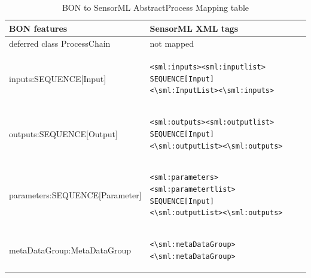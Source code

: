\documentclass[]{final_report}
\begin{document}
\begin{table}[!th]
\centering
\begin{tabular}{|l|l|}
\hline
BON features & SensorML XML tags\\
\hline
   deferred class ProcessChain  & not mapped\\
\hline     
     inputs:SEQUENCE[Input] & \begin{lstlisting}
<sml:inputs><sml:inputlist>
SEQUENCE[Input]
<\sml:InputList><\sml:inputs>\end{lstlisting}\\

\hline 
     outputs:SEQUENCE[Output] & \begin{lstlisting}
<sml:outputs><sml:outputlist>
SEQUENCE[Input]
<\sml:outputList><\sml:outputs>\end{lstlisting}\\
\hline
     parameters:SEQUENCE[Parameter] & \begin{lstlisting}
<sml:parameters><sml:parametertlist>
SEQUENCE[Input]
<\sml:outputList><\sml:outputs>\end{lstlisting}\\

\hline                 
     metaDataGroup:MetaDataGroup &  \begin{lstlisting}
<\sml:metaDataGroup><\sml:metaDataGroup>\end{lstlisting}\\
 \hline    

\end{tabular}
\caption{BON to SensorML AbstractProcess Mapping table}\label{table:bon_sml_example}
\label{ex:table}
\end{table}
\end{document}

